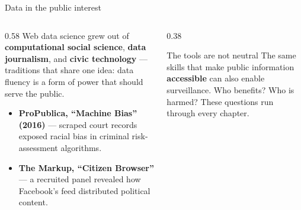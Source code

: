 \documentclass[9pt,aspectratio=169]{beamer}
\begin{document}
\begin{frame}{Data in the public interest}
    \begin{columns}[T]
        \begin{column}{0.58\textwidth}
            Web data science grew out of \textbf{computational social science}, \textbf{data journalism}, and \textbf{civic technology} --- traditions that share one idea: data fluency is a form of power that should serve the public.

            \vspace{0.75em}

            \begin{itemize}\small
                \item \textbf{ProPublica, ``Machine Bias'' (2016)} --- scraped court records exposed racial bias in criminal risk-assessment algorithms.
                \item \textbf{The Markup, ``Citizen Browser''} --- a recruited panel revealed how Facebook's feed distributed political content.
            \end{itemize}
        \end{column}
        \begin{column}{0.38\textwidth}
            \begin{alertblock}{The tools are not neutral}
                \footnotesize The same skills that make public information \textbf{accessible} can also enable surveillance. Who benefits? Who is harmed? These questions run through every chapter.
            \end{alertblock}
        \end{column}
    \end{columns}
\end{frame}
\end{document}
